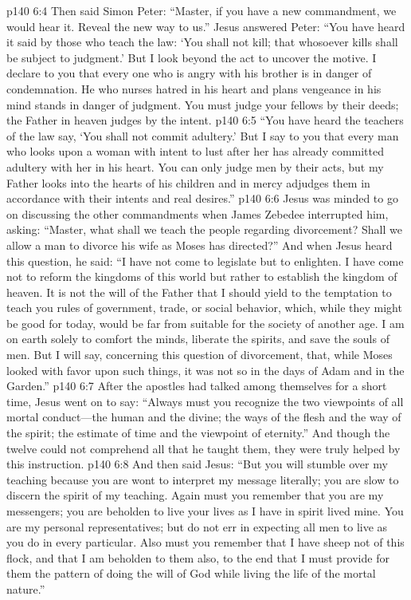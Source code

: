 \vs p140 6:4 Then said Simon Peter: “Master, if you have a new commandment, we would hear it. Reveal the new way to us.” Jesus answered Peter: \textcolor{ubdarkred}{“You have heard it said by those who teach the law: ‘You shall not kill; that whosoever kills shall be subject to judgment.’ But I look beyond the act to uncover the motive. I declare to you that every one who is angry with his brother is in danger of condemnation. He who nurses hatred in his heart and plans vengeance in his mind stands in danger of judgment. You must judge your fellows by their deeds; the Father in heaven judges by the intent.}
\vs p140 6:5 \textcolor{ubdarkred}{“You have heard the teachers of the law say, ‘You shall not commit adultery.’ But I say to you that every man who looks upon a woman with intent to lust after her has already committed adultery with her in his heart. You can only judge men by their acts, but my Father looks into the hearts of his children and in mercy adjudges them in accordance with their intents and real desires.”}
\vs p140 6:6 Jesus was minded to go on discussing the other commandments when James Zebedee interrupted him, asking: “Master, what shall we teach the people regarding divorcement? Shall we allow a man to divorce his wife as Moses has directed?” And when Jesus heard this question, he said: \textcolor{ubdarkred}{“I have not come to legislate but to enlighten. I have come not to reform the kingdoms of this world but rather to establish the kingdom of heaven. It is not the will of the Father that I should yield to the temptation to teach you rules of government, trade, or social behavior, which, while they might be good for today, would be far from suitable for the society of another age. I am on earth solely to comfort the minds, liberate the spirits, and save the souls of men. But I will say, concerning this question of divorcement, that, while Moses looked with favor upon such things, it was not so in the days of Adam and in the Garden.”}\plusone
\vs p140 6:7 After the apostles had talked among themselves for a short time, Jesus went on to say: \textcolor{ubdarkred}{“Always must you recognize the two viewpoints of all mortal conduct---the human and the divine; the ways of the flesh and the way of the spirit; the estimate of time and the viewpoint of eternity.”} And though the twelve could not comprehend all that he taught them, they were truly helped by this instruction.
\vs p140 6:8 And then said Jesus: \textcolor{ubdarkred}{“But you will stumble over my teaching because you are wont to interpret my message literally; you are slow to discern the spirit of my teaching. Again must you remember that you are my messengers; you are beholden to live your lives as I have in spirit lived mine. You are my personal representatives; but do not err in expecting all men to live as you do in every particular. Also must you remember that I have sheep not of this flock, and that I am beholden to them also, to the end that I must provide for them the pattern of doing the will of God while living the life of the mortal nature.”}
